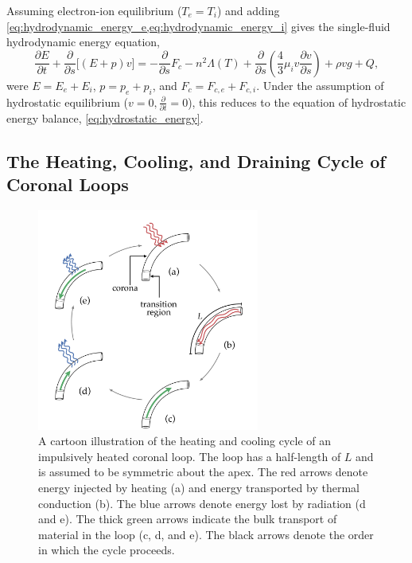 Assuming electron-ion equilibrium ($T_e=T_i$) and adding \cref{eq:hydrodynamic_energy_e,eq:hydrodynamic_energy_i} gives the single-fluid hydrodynamic energy equation,
\begin{equation}\label{eq:hydrodynamic_energy}
    \frac{\partial E}{\partial t} + \frac{\partial}{\partial s}\lbrack(E+p)v\rbrack = - \frac{\partial}{\partial s}F_c - n^2\Lambda(T) + \frac{\partial}{\partial s}\left(\frac{4}{3}\mu_iv\frac{\partial v}{\partial s}\right) +\rho vg + Q, 
\end{equation}
were $E=E_e + E_i$, $p=p_e+p_i$, and $F_c=F_{c,e} + F_{c,i}$. Under the  assumption of hydrostatic equilibrium ($v=0,\frac{\partial}{\partial t}=0$), this reduces to the equation of hydrostatic energy balance, \autoref{eq:hydrostatic_energy}.

\subsection{The Heating, Cooling, and Draining Cycle of Coronal Loops}\label{sec:heating-cooling-cycle}

\begin{figure}[!h]
    \centering
    \includegraphics[width=0.65\textwidth]{chapter2/figures/heating-cooling-cycle-cartoon.pdf}
    \caption{A cartoon illustration of the heating and cooling cycle of an impulsively heated coronal loop. The loop has a half-length of $L$ and is assumed to be symmetric about the apex. The red arrows denote energy injected by heating (a) and energy transported by thermal conduction (b). The blue arrows denote energy lost by radiation (d and e). The thick green arrows indicate the bulk transport of material in the loop (c, d, and e). The black arrows denote the order in which the cycle proceeds.}
    \label{fig:heating-cooling-cycle-cartoon}
\end{figure}

